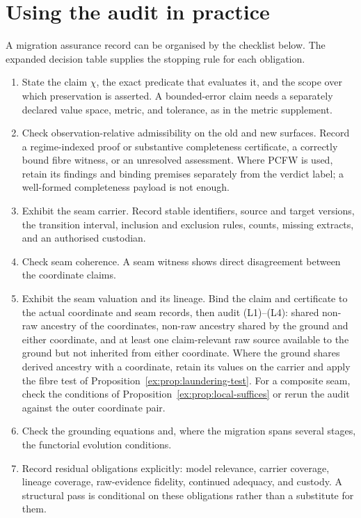 \documentclass[11pt]{article}
\theoremstyle{definition}
\begin{document}
\section{Using the audit in practice}\label{ex:sec:practice}
A migration assurance record can be organised by the checklist below. The expanded decision table supplies the stopping rule for each obligation.
\begin{enumerate}
\item State the claim $\chi$, the exact predicate that evaluates it, and the scope over which preservation is asserted. A bounded-error claim needs a separately declared value space, metric, and tolerance, as in the metric supplement.
\item Check observation-relative admissibility on the old and new surfaces. Record a regime-indexed proof or substantive completeness certificate, a correctly bound fibre witness, or an unresolved assessment. Where PCFW is used, retain its findings and binding premises separately from the verdict label; a well-formed completeness payload is not enough.
\item Exhibit the seam carrier. Record stable identifiers, source and target versions, the transition interval, inclusion and exclusion rules, counts, missing extracts, and an authorised custodian.
\item Check seam coherence. A seam witness shows direct disagreement between the coordinate claims.
\item Exhibit the seam valuation and its lineage. Bind the claim and certificate to the actual coordinate and seam records, then audit (L1)--(L4): shared non-raw ancestry of the coordinates, non-raw ancestry shared by the ground and either coordinate, and at least one claim-relevant raw source available to the ground but not inherited from either coordinate. Where the ground shares derived ancestry with a coordinate, retain its values on the carrier and apply the fibre test of Proposition~\ref{ex:prop:laundering-test}. For a composite seam, check the conditions of Proposition~\ref{ex:prop:local-suffices} or rerun the audit against the outer coordinate pair.
\item Check the grounding equations and, where the migration spans several stages, the functorial evolution conditions.
\item Record residual obligations explicitly: model relevance, carrier coverage, lineage coverage, raw-evidence fidelity, continued adequacy, and custody. A structural pass is conditional on these obligations rather than a substitute for them.
\end{enumerate}
\end{document}
